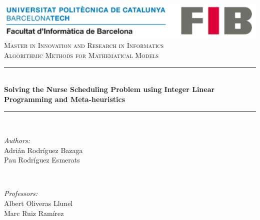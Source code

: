 \documentclass[a4paper]{article}
\begin{document}
\begin{titlepage}

\newcommand{\HRule}{\rule{\linewidth}{0.5mm}} 							%
\newenvironment{bottompar}{\par\vspace*{\fill}}{\clearpage}
\center 
\begin{center}
\includegraphics[scale=0.8]{upclogo.png}\\[2cm] %
 
\textsc{\Large Master in Innovation and Research in Informatics}\\[0.5cm] %
\textsc{\large Algorithmic Methods for Mathematical Models}\\[5cm] %


\HRule \\[0.4cm]
{ \huge \bfseries Solving the Nurse Scheduling Problem using Integer Linear Programming and Meta-heuristics}\\[0.4cm] %
\HRule \\[1.5cm]
 
\begin{bottompar}
\begin{minipage}{0.5\textwidth}
\begin{flushleft} \large
\emph{Authors:}\\
Adrián Rodríguez Bazaga \\ Pau Rodríguez Esmerats %
\end{flushleft}
\end{minipage}
~
\begin{minipage}{0.4\textwidth}
\begin{flushright} \large
\emph{Professors:} \\
Albert Oliveras Llunel \\ Marc Ruiz Ramírez %
\end{flushright}
\end{minipage}\\[2cm]


\end{bottompar}
\end{center}
\end{titlepage}
\end{document}
